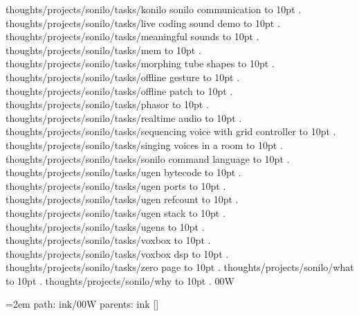 thoughts/projects/sonilo/tasks/konilo sonilo communication \leaders\hbox to 10pt {\hss.\hss}  \hfill {}
\smallskip
thoughts/projects/sonilo/tasks/live coding sound demo \leaders\hbox to 10pt {\hss.\hss}  \hfill {}
\smallskip
thoughts/projects/sonilo/tasks/meaningful sounds \leaders\hbox to 10pt {\hss.\hss}  \hfill {}
\smallskip
thoughts/projects/sonilo/tasks/mem \leaders\hbox to 10pt {\hss.\hss}  \hfill {}
\smallskip
thoughts/projects/sonilo/tasks/morphing tube shapes \leaders\hbox to 10pt {\hss.\hss}  \hfill {}
\smallskip
thoughts/projects/sonilo/tasks/offline gesture \leaders\hbox to 10pt {\hss.\hss}  \hfill {}
\smallskip
thoughts/projects/sonilo/tasks/offline patch \leaders\hbox to 10pt {\hss.\hss}  \hfill {}
\smallskip
thoughts/projects/sonilo/tasks/phasor \leaders\hbox to 10pt {\hss.\hss}  \hfill {}
\smallskip
thoughts/projects/sonilo/tasks/realtime audio \leaders\hbox to 10pt {\hss.\hss}  \hfill {}
\smallskip
thoughts/projects/sonilo/tasks/sequencing voice with grid controller \leaders\hbox to 10pt {\hss.\hss}  \hfill {}
\smallskip
thoughts/projects/sonilo/tasks/singing voices in a room \leaders\hbox to 10pt {\hss.\hss}  \hfill {}
\smallskip
thoughts/projects/sonilo/tasks/sonilo command language \leaders\hbox to 10pt {\hss.\hss}  \hfill {}
\smallskip
thoughts/projects/sonilo/tasks/ugen bytecode \leaders\hbox to 10pt {\hss.\hss}  \hfill {}
\smallskip
thoughts/projects/sonilo/tasks/ugen ports \leaders\hbox to 10pt {\hss.\hss}  \hfill {}
\smallskip
thoughts/projects/sonilo/tasks/ugen refcount \leaders\hbox to 10pt {\hss.\hss}  \hfill {}
\smallskip
thoughts/projects/sonilo/tasks/ugen stack \leaders\hbox to 10pt {\hss.\hss}  \hfill {}
\smallskip
thoughts/projects/sonilo/tasks/ugens \leaders\hbox to 10pt {\hss.\hss}  \hfill {}
\smallskip
thoughts/projects/sonilo/tasks/voxbox \leaders\hbox to 10pt {\hss.\hss}  \hfill {}
\smallskip
thoughts/projects/sonilo/tasks/voxbox dsp \leaders\hbox to 10pt {\hss.\hss}  \hfill {}
\smallskip
thoughts/projects/sonilo/tasks/zero page \leaders\hbox to 10pt {\hss.\hss}  \hfill {}
\smallskip
thoughts/projects/sonilo/what \leaders\hbox to 10pt {\hss.\hss}  \hfill {}
\smallskip
thoughts/projects/sonilo/why \leaders\hbox to 10pt {\hss.\hss}  \hfill {}
\smallskip
\vfill \break
{}
00W
\smallskip
\par\begingroup
\leftskip=2em
path: ink/00W
\smallskip
parents:  ink []
\smallskip
